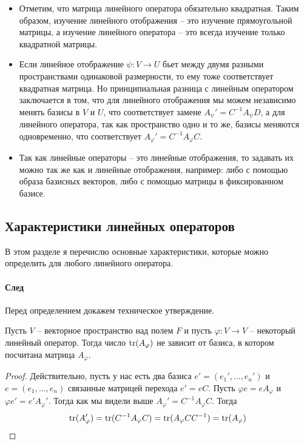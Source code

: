 \begin{itemize}
\item Отметим, что матрица линейного оператора обязательно квадратная.
Таким образом, изучение линейного отображения -- это изучение прямоугольной матрицы, а изучение линейного оператора -- это всегда изучение только квадратной матрицы.

\item Если линейное отображение $\psi\colon V\to U$ бьет между двумя разными пространствами одинаковой размерности, то ему тоже соответствует квадратная матрица.
Но принципиальная разница с линейным оператором заключается в том, что для линейного отображения мы можем независимо менять базисы в $V$ и $U$, что соответствует замене $A_\psi' = C^{-1}A_\psi D$, а для линейного оператора, так как пространство одно и то же, базисы меняются одновременно, что соответствует $A_\varphi' = C^{-1}A_\varphi C$.

\item Так как линейные операторы -- это линейные отображения, то задавать их можно так же как и линейные отображения, например: либо с помощью образа базисных векторов, либо с помощью матрицы в фиксированном базисе.
\end{itemize}

\subsection{Характеристики линейных операторов}

В этом разделе я перечислю основные характеристики, которые можно определить для любого линейного оператора.

\paragraph{След}

Перед определением докажем техническое утверждение.

\begin{claim*}
Пусть $V$ -- векторное пространство над полем $F$ и пусть $\varphi\colon V\to V$ -- некоторый линейный оператор.
Тогда число $\operatorname{tr}(A_\varphi)$ не зависит от базиса, в котором посчитана матрица $A_\varphi$.
\end{claim*}
\begin{proof}
Действительно, пусть у нас есть два базиса $e' = (e_1',\ldots,e_n')$ и $e = (e_1,\ldots,e_n)$ связанные матрицей перехода $e' = eC$.
Пусть $\varphi e = eA_\varphi$ и $\varphi e' = e' A_\varphi'$.
Тогда как мы видели выше $A_\varphi' = C^{-1} A_\varphi C$.
Тогда
\[
\operatorname{tr}(A_\varphi') = \operatorname{tr} (C^{-1}A_\varphi C) = \operatorname{tr}(A_\varphi C C^{-1}) = \operatorname{tr}(A_\varphi)
\]
\end{proof}

